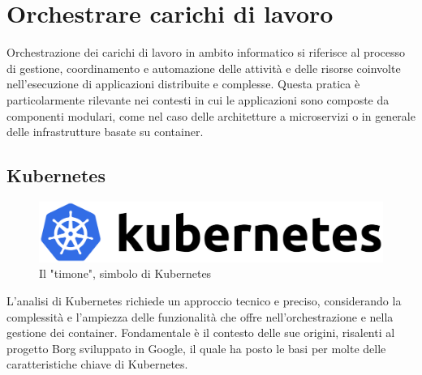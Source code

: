 % 
% 
% 



\section{Orchestrare carichi di lavoro}

Orchestrazione dei carichi di lavoro in ambito informatico si riferisce al processo di gestione, coordinamento e automazione delle attività e delle risorse coinvolte nell'esecuzione di applicazioni distribuite e complesse. Questa pratica è particolarmente rilevante nei contesti in cui le applicazioni sono composte da componenti modulari, come nel caso delle architetture a microservizi o in generale delle infrastrutture basate su container.

\subsection{Kubernetes}

\begin{figure}[h]
    \centering
    \includegraphics[width=\linewidth]{figures/ch3/kubernetes-logo.png}
    \caption[Il "timone", simbolo di Kubernetes]{Il "timone", simbolo di Kubernetes}
    \label{fig:cha3:k8s2}
\end{figure}

L'analisi di Kubernetes richiede un approccio tecnico e preciso, considerando la complessità e l'ampiezza delle funzionalità che offre nell'orchestrazione e nella gestione dei container. Fondamentale è il contesto delle sue origini, risalenti al progetto Borg sviluppato in Google, il quale ha posto le basi per molte delle caratteristiche chiave di Kubernetes.


